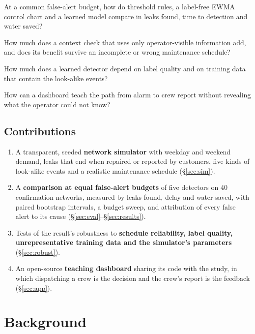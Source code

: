 \documentclass[11pt,a4paper]{article}
\begin{document}
\begin{description}[leftmargin=2.6em,style=nextline]
  \item[RQ1] At a common false-alert budget, how do threshold rules, a label-free EWMA control chart and a learned model compare in leaks found, time to detection and water saved?
  \item[RQ2] How much does a context check that uses only operator-visible information add, and does its benefit survive an incomplete or wrong maintenance schedule?
  \item[RQ3] How much does a learned detector depend on label quality and on training data that contain the look-alike events?
  \item[RQ4] How can a dashboard teach the path from alarm to crew report without revealing what the operator could not know?
\end{description}

\subsection{Contributions}

\begin{enumerate}
  \item A transparent, seeded \textbf{network simulator} with weekday and weekend demand, leaks that end when repaired or reported by customers, five kinds of look-alike events and a realistic maintenance schedule (\S\ref{sec:sim}).
  \item A \textbf{comparison at equal false-alert budgets} of five detectors on 40 confirmation networks, measured by leaks found, delay and water saved, with paired bootstrap intervals, a budget sweep, and attribution of every false alert to its cause (\S\ref{sec:eval}--\S\ref{sec:results}).
  \item Tests of the result's robustness to \textbf{schedule reliability, label quality, unrepresentative training data and the simulator's parameters} (\S\ref{sec:robust}).
  \item An open-source \textbf{teaching dashboard} sharing its code with the study, in which dispatching a crew is the decision and the crew's report is the feedback (\S\ref{sec:app}).
\end{enumerate}

\section{Background}
\end{document}
